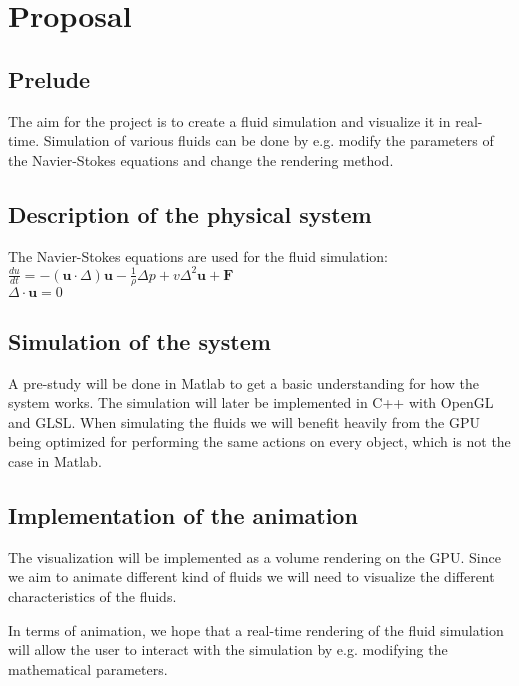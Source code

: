 \documentclass[a4paper,12pt,twoside,swedish]{report}
\begin{document}
\pagestyle{plain}

\setcounter{page}{1}

\chapter{Proposal}

\section{Prelude}
The aim for the project is to create a fluid simulation and visualize it in real-time. Simulation of various fluids can be done by e.g. modify the parameters of the Navier-Stokes equations and change the rendering method.

\section{Description of the physical system}
The Navier-Stokes equations are used for the fluid simulation:\\

\(\frac{du}{dt} = - (\textbf{u}\cdot{\Delta})\textbf{u} - \frac{1}{\rho}\Delta p + v \Delta^2 \textbf{u} + \textbf{F}\) \\
\(\Delta \cdot \textbf{u} = 0 \) \\

\section{Simulation of the system}
A pre-study will be done in Matlab to get a basic understanding for how the system works. The simulation will later be implemented in C++ with OpenGL and GLSL. When simulating the fluids we will benefit heavily from the GPU being optimized for performing the same actions on every object, which is not the case in Matlab.

\section{Implementation of the animation}
The visualization will be implemented as a volume rendering on the GPU. Since we aim to animate different kind of fluids we will need to visualize the different characteristics of the fluids.

In terms of animation, we hope that a real-time rendering of the fluid simulation will allow the user to interact with the simulation by e.g. modifying the mathematical parameters.
\end{document}
